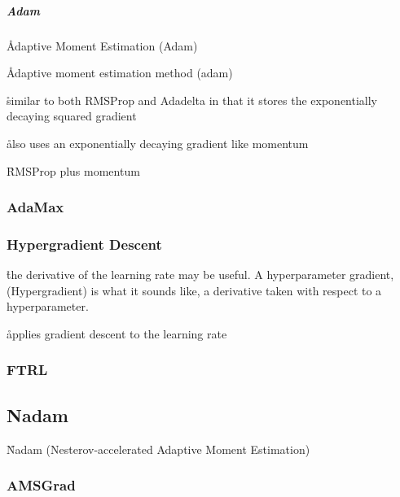 \subparagraph{Adam}

\r{Adaptive Moment Estimation (Adam)~\cite{kingma2014adam}}

\r{Adaptive moment estimation method (adam)}

\r{similar to both RMSProp and Adadelta in that it stores the exponentially decaying squared gradient}

\r{also uses an exponentially decaying gradient like momentum}

\r{RMSProp plus momentum}


\subsubsection{AdaMax}


\subsubsection{Hypergradient Descent}


\r{the derivative of the learning rate may be useful. A hyperparameter gradient, (Hypergradient) is what it sounds like, a derivative taken with respect to a hyperparameter.}

\r{applies gradient descent to the learning rate}



\subsubsection{FTRL}




\subsection{Nadam}

\r{Nadam (Nesterov-accelerated Adaptive Moment Estimation)~\cite{dozat2016incorporating}}


\subsubsection{AMSGrad}

